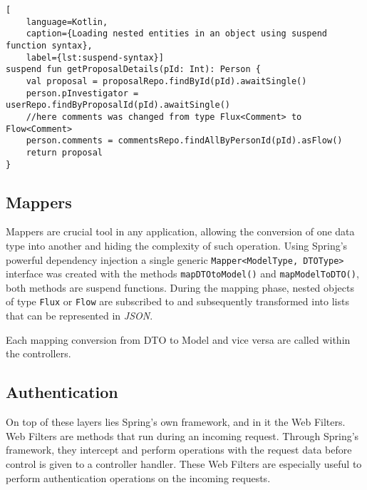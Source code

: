 \begin{lstlisting}[
    language=Kotlin, 
    caption={Loading nested entities in an object using suspend function syntax},
    label={lst:suspend-syntax}]
suspend fun getProposalDetails(pId: Int): Person {
    val proposal = proposalRepo.findById(pId).awaitSingle()
    person.pInvestigator = userRepo.findByProposalId(pId).awaitSingle()
    //here comments was changed from type Flux<Comment> to Flow<Comment>
    person.comments = commentsRepo.findAllByPersonId(pId).asFlow()
    return proposal
}    
\end{lstlisting}


\subsection{Mappers}

Mappers are crucial tool in any application, allowing the conversion of one data type into another and hiding the complexity of such operation. Using Spring's powerful dependency injection a single generic \texttt{Mapper<ModelType, DTOType>} interface was created with the methods \texttt{mapDTOtoModel()} and \texttt{mapModelToDTO()}, both methods are suspend functions.
During the mapping phase, nested objects of type \texttt{Flux} or \texttt{Flow} are subscribed to and subsequently transformed into lists that can be represented in \textit{JSON}.

Each mapping conversion from DTO to Model and vice versa are called within the controllers.


\subsection{Authentication}

On top of these layers lies Spring's own framework, and in it the Web Filters. Web Filters are methods that run during an incoming request. Through Spring's framework, they intercept and perform operations with the request data before control is given to a controller handler. 
These Web Filters are especially useful to perform authentication operations on the incoming requests.



